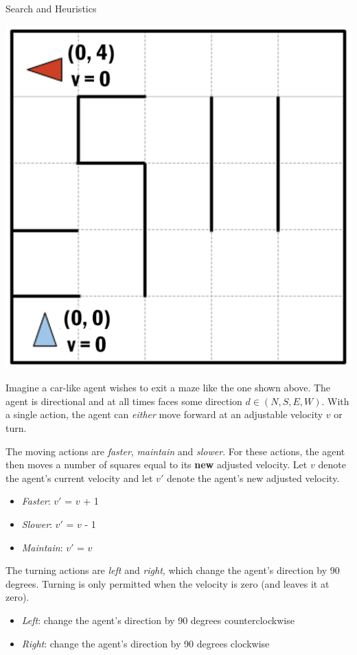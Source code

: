 \begin{problem} {Search and Heuristics}

\begin{center} \includegraphics[scale=.33]{figures/movingagent.png} 
\end{center}

Imagine a car-like agent wishes to exit a maze like the one shown above. The agent is directional and at all times faces some direction $d \in (N, S, E, W)$. With a single action, the agent can \textit{either} move forward at an adjustable velocity $v$ or turn.

The moving actions are \textit{faster}, \textit{maintain} and \textit{slower}. For these actions, the agent then moves a number of squares equal to its \textbf{new} adjusted velocity. Let $v$ denote the agent's current velocity and let $v'$ denote the agent's new adjusted velocity.
\begin{itemize}[noitemsep,topsep=0pt]
    \item \textit{Faster}: $v'$ = $v$ + 1
    \item \textit{Slower}: $v'$ = $v$ - 1
    \item \textit{Maintain}: $v'$ = $v$
\end{itemize}

The turning actions are \textit{left} and \textit{right}, which change the agent’s direction by 90 degrees. Turning is only permitted when the velocity is zero (and leaves it at zero). 
\begin{itemize}[noitemsep,topsep=0pt]
    \item \textit{Left}: change the agent’s direction by 90 degrees counterclockwise
    \item \textit{Right}: change the agent’s direction by 90 degrees clockwise
\end{itemize}


\end{problem}
